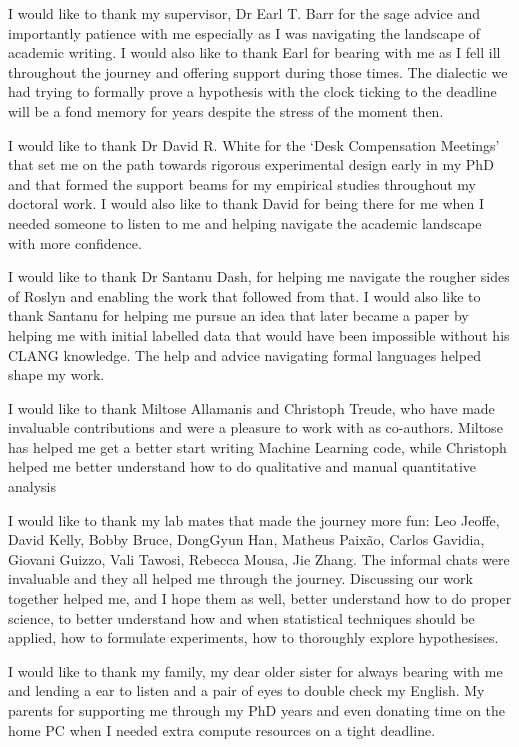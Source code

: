 \begin{acknowledgements}
I would like to thank my supervisor, Dr Earl T. Barr for the sage advice and
importantly patience with me especially as I was navigating the landscape of
academic writing. I would also like to thank Earl for bearing with me as I fell
ill throughout the journey and offering support during those times. The
dialectic we had trying to formally prove a hypothesis with the clock ticking to
the deadline will be a fond memory for years despite the stress of the moment
then.

I would like to thank Dr David R. White for the `Desk Compensation Meetings'
that set me on the path towards rigorous experimental design early in my PhD and
that formed the support beams for my empirical studies throughout my doctoral
work. I would also like to thank David for being there for me when I needed
someone to listen to me and helping navigate the academic landscape with more
confidence.

I would like to thank Dr Santanu Dash, for helping me navigate the rougher sides
of Roslyn and enabling the work that followed from that. I would also like to
thank Santanu for helping me pursue an idea that later became a paper by helping
me with initial labelled data that would have been impossible without his CLANG
knowledge. The help and advice navigating formal languages helped shape my work.

I would like to thank Miltose Allamanis and Christoph Treude, who have made
invaluable contributions and were a pleasure to work with as co-authors. Miltose
has helped me get a better start writing Machine Learning code, while Christoph
helped me better understand how to do qualitative and manual quantitative
analysis

I would like to thank my lab mates that made the journey more fun: Leo Jeoffe,
David Kelly, Bobby Bruce, DongGyun Han, Matheus Paix\~ao, Carlos Gavidia,
Giovani Guizzo, Vali Tawosi, Rebecca Mousa, Jie Zhang. The informal chats were
invaluable and they all helped me through the journey. Discussing our work
together helped me, and I hope them as well, better understand how to do proper
science, to better understand how and when statistical techniques should be
applied, how to formulate experiments, how to thoroughly explore hypothesises.

I would like to thank my family, my dear older sister for always bearing with me
and lending a ear to listen and a pair of eyes to double check my English. My
parents for supporting me through my PhD years and even donating time on the
home PC when I needed extra compute resources on a tight deadline.

\end{acknowledgements}

\setcounter{tocdepth}{2} 

\tableofcontents
\listoffigures
\listoftables
{}

